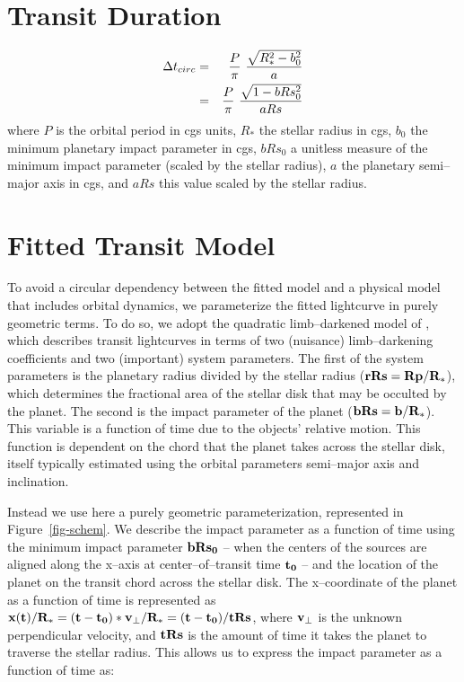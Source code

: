 \documentclass[prd, nofootinbib, floatfix, tightenlines, times]{article}
\begin{document}
\section{Transit Duration}

\begin{eqnarray}
\Delta t_{circ} & = & {{P}\over{\pi}}~{{\sqrt{R_*^2 - b_0^2}}\over{a}} \nonumber \\
                & = & {{P}\over{\pi}}~{{\sqrt{1 - bRs_0^2}}\over{aRs}}
\label{eq-tcirc}
\end{eqnarray}
where $P$ is the orbital period in cgs units, $R_*$ the stellar radius
in cgs, $b_0$ the minimum planetary impact parameter in cgs, $bRs_0$ a
unitless measure of the minimum impact parameter (scaled by the stellar
radius), $a$ the planetary semi--major axis in cgs, and $aRs$ this
value scaled by the stellar radius.

\section{Fitted Transit Model}
To avoid a circular dependency between the fitted model and a physical
model that includes orbital dynamics, we parameterize the fitted
lightcurve in purely geometric terms.  To do so, we adopt the
quadratic limb--darkened model of \cite{2002ApJ...580L.171M}, which
describes transit lightcurves in terms of two (nuisance)
limb--darkening coefficients and two (important) system parameters.
The first of the system parameters is the planetary radius divided by
the stellar radius (${\bf rRs = Rp/R_*}$), which determines the
fractional area of the stellar disk that may be occulted by the
planet.  The second is the impact parameter of the planet (${\bf bRs =
  b/R_*}$).  This variable is a function of time due to the objects'
relative motion.  This function is dependent on the chord that the
planet takes across the stellar disk, itself typically estimated using
the orbital parameters semi--major axis and inclination.  


Instead we use here a purely geometric parameterization, represented
in Figure~\ref{fig-schem}.  We describe the impact parameter as a
function of time using the minimum impact parameter ${\bf bRs_0}$ --
when the centers of the sources are aligned along the x--axis at
center--of--transit time ${\bf t_0}$ -- and the location of the planet
on the transit chord across the stellar disk.  The x--coordinate of
the planet as a function of time is represented as ${\bf x(t) / R_* =
  (t - t_0) * v_\perp / R_* = (t - t_0) / tRs}$, where ${\bf v_\perp}$
is the unknown perpendicular velocity, and ${\bf tRs}$ is the amount
of time it takes the planet to traverse the stellar radius.  This
allows us to express the impact parameter as a function of time as:
\end{document}

